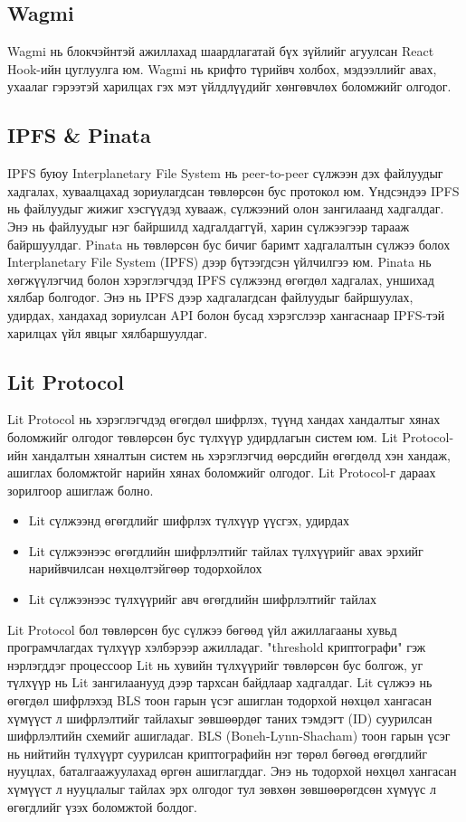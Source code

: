 \subsection{Wagmi}
Wagmi нь блокчэйнтэй ажиллахад шаардлагатай бүх зүйлийг агуулсан React Hook-ийн цуглуулга юм. Wagmi нь крифто түрийвч холбох, мэдээллийг авах, ухаалаг гэрээтэй харилцах гэх мэт үйлдлүүдийг хөнгөвчлөх боломжийг олгодог.

\subsection{IPFS \& Pinata}
IPFS буюу Interplanetary File System нь peer-to-peer сүлжээн дэх файлуудыг хадгалах, хуваалцахад зориулагдсан төвлөрсөн бус протокол юм. Үндсэндээ IPFS нь файлуудыг жижиг хэсгүүдэд хувааж, сүлжээний олон зангилаанд хадгалдаг. Энэ нь файлуудыг нэг байршилд хадгалдаггүй, харин сүлжээгээр тарааж байршуулдаг.
Pinata нь төвлөрсөн бус бичиг баримт хадгалалтын сүлжээ болох Interplanetary File System (IPFS) дээр бүтээгдсэн үйлчилгээ юм. Pinata нь хөгжүүлэгчид болон хэрэглэгчдэд IPFS сүлжээнд өгөгдөл хадгалах, уншихад хялбар болгодог. Энэ нь IPFS дээр хадгалагдсан файлуудыг байршуулах, удирдах, хандахад зориулсан API болон бусад хэрэгслээр хангаснаар IPFS-тэй харилцах үйл явцыг хялбаршуулдаг.

\subsection{Lit Protocol}
Lit Protocol нь хэрэглэгчдэд өгөгдөл шифрлэх, түүнд хандах хандалтыг хянах боломжийг олгодог төвлөрсөн бус түлхүүр удирдлагын систем юм. Lit Protocol-ийн хандалтын хяналтын систем нь хэрэглэгчид өөрсдийн өгөгдөлд хэн хандаж, ашиглах боломжтойг нарийн хянах боломжийг олгодог.
Lit Protocol-г дараах зорилгоор ашиглаж болно.
\begin{itemize}
   \item Lit сүлжээнд өгөгдлийг шифрлэх түлхүүр үүсгэх, удирдах
   \item Lit сүлжээнээс өгөгдлийн шифрлэлтийг тайлах түлхүүрийг авах эрхийг нарийвчилсан нөхцөлтэйгөөр тодорхойлох
   \item Lit сүлжээнээс түлхүүрийг авч өгөгдлийн шифрлэлтийг тайлах
\end{itemize}

Lit Protocol бол төвлөрсөн бус сүлжээ бөгөөд үйл ажиллагааны хувьд програмчлагдах түлхүүр хэлбэрээр ажилладаг. "threshold криптографи" гэж нэрлэгддэг процессоор Lit нь хувийн түлхүүрийг төвлөрсөн бус болгож, уг түлхүүр нь Lit зангилаанууд дээр тархсан байдлаар хадгалдаг.
Lit сүлжээ нь өгөгдөл шифрлэхэд BLS тоон гарын үсэг ашиглан тодорхой нөхцөл хангасан хүмүүст л шифрлэлтийг тайлахыг зөвшөөрдөг таних тэмдэгт (ID) суурилсан шифрлэлтийн схемийг ашигладаг.
BLS (Boneh-Lynn-Shacham) тоон гарын үсэг нь нийтийн түлхүүрт суурилсан криптографийн нэг төрөл бөгөөд өгөгдлийг нууцлах, баталгаажуулахад өргөн ашиглагддаг. Энэ нь тодорхой нөхцөл хангасан хүмүүст л нууцлалыг тайлах эрх олгодог тул зөвхөн зөвшөөрөгдсөн хүмүүс л өгөгдлийг үзэх боломжтой болдог.

